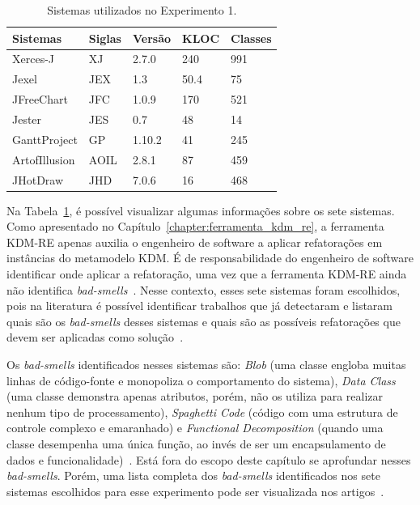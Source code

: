 \begin{table}[h]
\centering
\caption{Sistemas utilizados no Experimento 1.}
\label{tab:sistemas_experimentos}
\begin{tabular}{ | m{2cm} | m{1cm}| m{1cm}| m{1cm} | m{1cm} | } 
\hline
Sistemas & Siglas & Versão & KLOC & Classes \\ 
\hline
Xerces-J & XJ & 2.7.0 & 240 & 991\\ 
\hline
Jexel & JEX & 1.3 & 50.4 & 75\\
\hline
JFreeChart & JFC & 1.0.9 & 170 & 521\\ 
\hline
Jester & JES & 0.7 & 48 & 14\\ 
\hline
GanttProject & GP & 1.10.2 & 41 & 245\\ 
\hline
ArtofIllusion & AOIL &  2.8.1 & 87 & 459\\ 
\hline
JHotDraw & JHD & 7.0.6 & 16 & 468 \\ 
\hline
\end{tabular}
\end{table}

Na Tabela~\ref{tab:sistemas_experimentos}, é possível visualizar algumas informações sobre os sete sistemas. Como apresentado no Capítulo~\ref{chapter:ferramenta_kdm_re}, a ferramenta KDM-RE apenas auxilia o engenheiro de software a aplicar refatorações em instâncias do metamodelo KDM. É de responsabilidade do engenheiro de software identificar onde aplicar a refatoração, uma vez que a ferramenta KDM-RE ainda não identifica \textit{bad-smells}~\cite{Fowler1999}. Nesse contexto, esses sete sistemas foram escolhidos, pois na literatura é possível identificar trabalhos que já detectaram e listaram quais são os \textit{bad-smells} desses sistemas e quais são as possíveis refatorações que devem ser aplicadas como solução~\cite{Kessentini_2011, Ouni_2013, Moha_2010, Kessentini_2010}. %



Os \textit{bad-smells} identificados nesses sistemas são: \textit{Blob} (uma classe engloba muitas linhas de código-fonte e monopoliza o comportamento do sistema), \textit{Data Class} (uma classe demonstra apenas atributos, porém, não os utiliza para realizar nenhum tipo de processamento), \textit{Spaghetti Code} (código com uma estrutura de controle complexo e emaranhado) e \textit{Functional Decomposition} (quando uma classe desempenha uma única função, ao invés de ser um encapsulamento de dados e funcionalidade)~\cite{Fowler1999}. Está fora do escopo deste capítulo se aprofundar nesses \textit{bad-smells}. Porém, uma lista completa dos \textit{bad-smells} identificados nos sete sistemas escolhidos para esse experimento pode ser visualizada nos artigos~.

